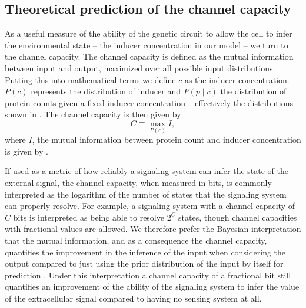 \subsection{Theoretical prediction of the channel capacity}
\label{sec_channcap}

As a useful measure of the ability of the genetic circuit to allow the cell to
infer the environmental state -- the inducer concentration in our model -- we
turn to the channel capacity. The channel capacity is defined as the mutual
information between input and output, maximized over all possible input
distributions. Putting this into mathematical terms we define $c$ as the
inducer concentration. $P(c)$ represents the distribution of inducer and $P(p
\mid c)$ the distribution of protein counts given a fixed inducer concentration
-- effectively the distributions shown in . The channel
capacity is then given by
\begin{equation}
  C \equiv \max_{P(c)} I,
  \label{eq_chann_cap}
\end{equation}
where $I$, the mutual information between protein count and inducer
concentration is given by .

If used as a metric of how reliably a signaling system can infer the state of
the external signal, the channel capacity, when measured in bits, is commonly
interpreted as the logarithm of the number of states that the signaling system
can properly resolve. For example, a signaling system with a channel capacity
of $C$ bits is interpreted as being able to resolve $2^C$ states, though
channel capacities with fractional values are allowed. We therefore prefer
the Bayesian interpretation that the mutual information, and as a consequence
the channel capacity, quantifies the improvement in the inference of the input
when considering the output compared to just using the prior distribution of
the input by itself for prediction \cite{Voliotis2014a, Bowsher2014}. Under
this interpretation a channel capacity of a fractional bit still quantifies an
improvement of the ability of the signaling system to infer the value of the
extracellular signal compared to having no sensing system at all.

